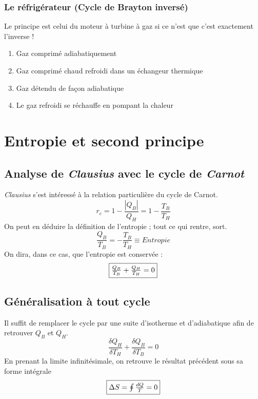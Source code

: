 \documentclass	[11pt, a4paper, openany]{book}
\begin{document}
\subsubsection{Le réfrigérateur (Cycle de Brayton inversé)}
Le principe est celui du moteur à turbine à gaz si ce n'est que c'est exactement l'inverse !
\begin{enumerate}
\item Gaz comprimé adiabatiquement
\item Gaz comprimé chaud refroidi dans un échangeur thermique
\item Gaz détendu de façon adiabatique
\item Le gaz refroidi se réchauffe en pompant la chaleur
\end{enumerate}

\newpage
\section{Entropie et second principe}
\subsection{Analyse de \textit{Clausius} avec le cycle de \textit{Carnot}}
\textit{Clausius} s'est intéressé à la relation particulière du cycle de Carnot.
\begin{equation}
r_c = 1 - \frac{|Q_B|}{Q_H} = 1 - \frac{T_B}{T_H}
\end{equation}
On peut en déduire la définition de l'entropie ; tout ce qui rentre, sort.
\begin{equation}
\frac{Q_B}{T_B} = -\frac{T_B}{T_H} \equiv Entropie
\end{equation}
On dira, dans ce cas, que l'entropie est conservée :
\begin{equation}
\fbox{$\frac{Q_B}{T_B} + \frac{Q_H}{T_H} = 0$}
\end{equation}

\subsection{Généralisation à tout cycle}
Il suffit de remplacer le cycle par une suite d'isotherme et d'adiabatique afin de retrouver $Q_B$ et $Q_H$.
\begin{equation}
\frac{\delta Q_H}{\delta T_H} + \frac{\delta Q_B}{\delta T_B} = 0
\end{equation}
En prenant la limite infinitésimale, on retrouve le résultat précédent sous sa forme intégrale
\begin{equation}
\fbox{$\Delta S =\oint \frac{dQ}{T} = 0$}
\end{equation}
\end{document}
